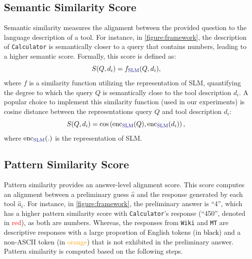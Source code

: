 \documentclass[11pt]{article}
\newcommand{\yiningchange}[2]{{\color{ForestGreen}{\st{#1}}{#2}}}
\newcommand{\llm}{\textcolor{darkredTwo}{LLM}}
\newcommand{\slm}{\textcolor{darkblueTwo}{SLM}}
\newcommand{\name}{{\fontfamily{cmss}\selectfont GEAR}}
\newcommand{\calc}{{\tt Calculator}}
\newcommand{\mt}{{\tt MT}}
\newcommand{\wiki}{{\tt Wiki}}
\begin{document}




\subsection{Semantic Similarity Score}
\label{subsec:semantic}
Semantic similarity measures the alignment between the provided question to the language description of a tool. 
For instance, in \autoref{figure:framework}, the description of \calc{} is semantically closer to a query that contains numbers, leading to a higher semantic score. 
Formally, this score is defined as: 
$$
S(Q,d_i) = f_{\text{\slm}}(Q, d_i),
$$
where $f$ is a similarity function utilizing the representation of \slm, quantifying the degree to which the query $Q$ is semantically close to the tool description $d_i$. A popular choice to implement this similarity function (used in our experiments) is cosine distance between the representations query $Q$ and tool description $d_i$:
$$
S(Q,d_i) = \text{cos}\left(\text{enc}_\text{\slm}(Q), \text{enc}_\text{\slm}(d_i) \right),
$$
where $\text{enc}_\text{\slm}(.)$ is the representation of \slm.

\subsection{Pattern Similarity Score}
\label{subsec:pattern}
Pattern similarity provides an answer-level alignment score. This score computes an alignment between a preliminary guess $\hat{a}$ and the response generated by each tool $\hat{a}_i$.  For instance, in \autoref{figure:framework}, the preliminary answer is ``4'', which has a higher pattern similarity score with \calc's response  (``450'', denoted in \textcolor{red}{red}), as both are numbers. Whereas, the responses from \wiki{} and \mt{} are descriptive responses with a large proportion of English tokens (in \textcolor{black}{black}) and a non-ASCII token (in \textcolor{orange}{orange}) that is not exhibited in the preliminary answer. Pattern similarity is computed based on the following steps. 
\end{document}
